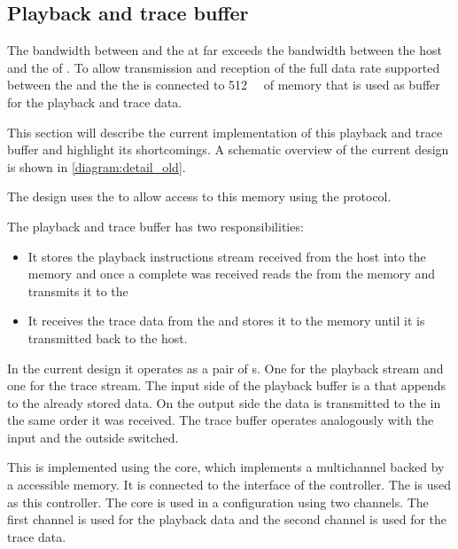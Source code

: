 \subsection{Playback and trace buffer}\label{sec:old-pb-trace-management}
The bandwidth between \FPGA{} and the \ASIC{} at \ASICBandwidth{} far exceeds the bandwidth between the host and the \FPGA{} of \HostBandwidth{}. To allow transmission and reception of the full data rate supported between the \FPGA{} and the \ASIC{} the \FPGA{} is connected to \SI{512}{\mebi\byte} of \DDR{} memory that is used as buffer for the playback and trace data.

This section will describe the current implementation of this playback and trace buffer and highlight its shortcomings. A schematic overview of the current design is shown in \autoref{diagram:detail_old}.

The \FPGA{} design uses the \XilinxMIG{} to allow access to this \DDR{} memory using the \AXI{} protocol.

The playback and trace buffer has two responsibilities:
\begin{itemize}
  \item It stores the playback instructions stream received from the host into the \DDR{} memory and once a complete \PlaybackProgram{} was received reads the \PlaybackProgram{} from the memory and transmits it to the \pbexec{}
  \item It receives the trace data from the \pbexec{} and stores it to the \DDR{} memory until it is transmitted back to the host.
\end{itemize}

In the current \FPGA{} design it operates as a pair of \FIFO{}s. One for the playback stream and one for the trace stream. The input side of the playback buffer is a \ValidNextStream{} that appends to the already stored data. On the output side the data is transmitted to the \pbexec{} in the same order it was received. The trace buffer operates analogously with the input and the outside switched.

This \FIFO{} is implemented using the \Xilinx{} \VFIFO{} core, which implements a multichannel \FIFO{} backed by a \AXI{} accessible memory. It is connected to the \AXI{} interface of the \DDR{} controller. The \XilinxMIG{} is used as this \DDR{} controller. The \VFIFO{} core is used in a configuration using two channels. The first channel is used for the playback data and the second channel is used for the trace data.

